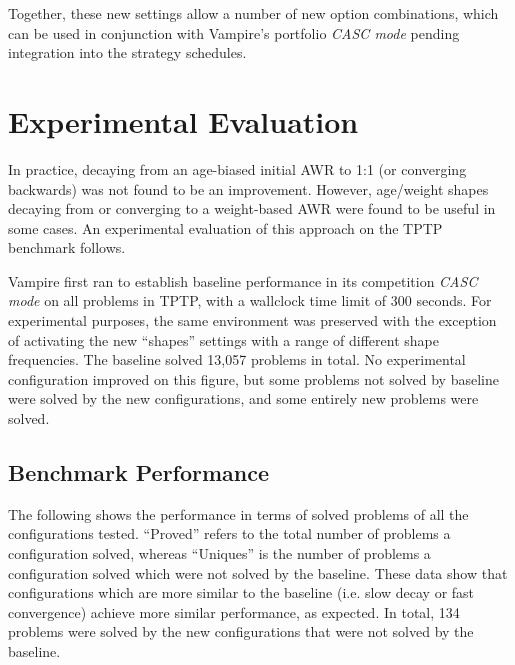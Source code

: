 \documentclass{llncs}
\begin{document}
Together, these new settings allow a number of new option combinations, which can be used in conjunction with Vampire's portfolio \emph{CASC mode} pending integration into the strategy schedules.

\section{Experimental Evaluation} \label{sec:experiments}


In practice, decaying from an age-biased initial AWR to 1:1 (or converging backwards) was not found to be an improvement.
However, age/weight shapes decaying from or converging to a weight-based AWR were found to be useful in some cases.
An experimental evaluation of this approach on the TPTP~\cite{tptp} benchmark follows.

Vampire first ran to establish baseline performance in its competition \emph{CASC mode} on all problems in TPTP, with a wallclock time limit of 300 seconds.
For experimental purposes, the same environment was preserved with the exception of activating the new ``shapes'' settings with a range of different shape frequencies.
The baseline solved 13,057 problems in total.
No experimental configuration improved on this figure, but some problems not solved by baseline were solved by the new configurations, and some entirely new problems were solved.

\subsection{Benchmark Performance}
The following shows the performance in terms of solved problems of all the configurations tested.
``Proved'' refers to the total number of problems a configuration solved, whereas ``Uniques'' is the number of problems a configuration solved which were not solved by the baseline.
These data show that configurations which are more similar to the baseline (i.e. slow decay or fast convergence) achieve more similar performance, as expected.
In total, 134 problems were solved by the new configurations that were not solved by the baseline.
\end{document}
